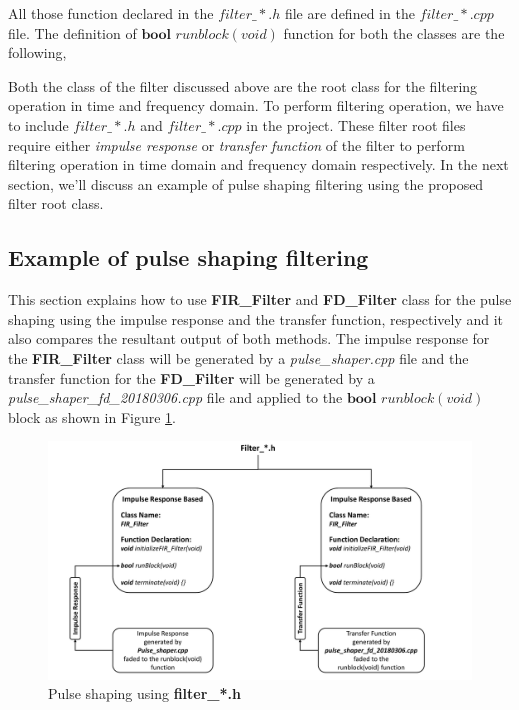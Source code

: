 All those function declared in the $filter\_*.h$ file are defined in the $filter\_*.cpp$ file. The definition of $\textbf{bool}$ $runblock(void)$ function for both the classes are the following,


Both the class of the filter discussed above are the root class for the filtering operation in time and frequency domain. To perform filtering operation, we have to include  $filter\_*.h$ and $filter\_*.cpp$ in the project. These filter root files require either \textit{impulse response} or \textit{transfer function} of the filter to perform filtering operation in time domain and frequency domain respectively. In the next section, we'll discuss an example of pulse shaping filtering using the proposed filter root class.

\subsection*{Example of pulse shaping filtering}
This section explains how to use \textbf{FIR\_Filter} and \textbf{FD\_Filter} class for the pulse shaping using the impulse response and the transfer function, respectively and it also compares the resultant output of both methods.
The impulse response for the \textbf{FIR\_Filter} class will be generated by a \textit{pulse\_shaper.cpp} file and the transfer function for the \textbf{FD\_Filter} will be generated by a \textit{pulse\_shaper\_fd\_20180306.cpp} file and applied to the $\textbf{bool}$ $runblock(void)$ block as shown in Figure \ref{Pulse_shaping}.
\begin{figure}[h]
	\centering
	\includegraphics[width=17cm]{./algorithms/filter/figures/Pulse_shaping.pdf}
	\caption{Pulse shaping using \textbf{filter\_*.h}}
	\label{Pulse_shaping}
\end{figure}
